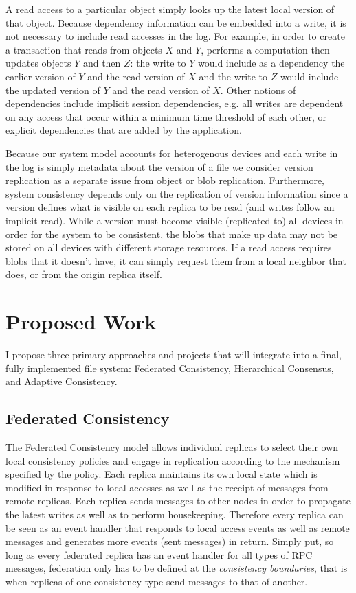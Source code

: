 \documentclass{article}
\begin{document}
A read access to a particular object simply looks up the latest local version of that object. Because dependency information can be embedded into a write, it is not necessary to include read accesses in the log. For example, in order to create a transaction that reads from objects $X$ and $Y$, performs a computation then updates objects $Y$ and then $Z$: the write to $Y$ would include as a dependency the earlier version of $Y$ and the read version of $X$ and the write to $Z$ would include the updated version of $Y$ and the read version of $X$. Other notions of dependencies include implicit session dependencies, e.g. all writes are dependent on any access that occur within a minimum time threshold of each other, or explicit dependencies that are added by the application.

Because our system model accounts for heterogenous devices and each write in the log is simply metadata about the version of a file we consider version replication as a separate issue from object or blob replication. Furthermore, system consistency depends only on the replication of version information since a version defines what is visible on each replica to be read (and writes follow an implicit read). While a version must become visible (replicated to) all devices in order for the system to be consistent, the blobs that make up data may not be stored on all devices with different storage resources. If a read access requires blobs that it doesn't have, it can simply request them from a local neighbor that does, or from the origin replica itself.

\section{Proposed Work}

I propose three primary approaches and projects that will integrate into a final, fully implemented file system: Federated Consistency, Hierarchical Consensus, and Adaptive Consistency.

\subsection{Federated Consistency}

The Federated Consistency model allows individual replicas to select their own local consistency policies and engage in replication according to the mechanism specified by the policy. Each replica maintains its own local state which is modified in response to local accesses as well as the receipt of messages from remote replicas. Each replica sends messages to other nodes in order to propagate the latest writes as well as to perform housekeeping. Therefore every replica can be seen as an event handler that responds to local access events as well as remote messages and generates more events (sent messages) in return. Simply put, so long as every federated replica has an event handler for all types of RPC messages, federation only has to be defined at the \textit{consistency boundaries}, that is when replicas of one consistency type send messages to that of another.
\end{document}
